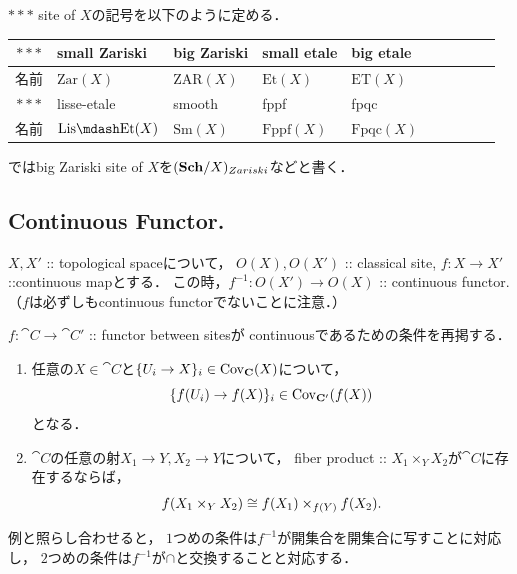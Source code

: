 \documentclass[a4paper]{jsarticle}
\begin{document}
\begin{Def}
    $***$ site of $X$の記号を以下のように定める．
\begin{table}[ht]
\begin{tabular}{c|lllllllll@{}}
    \toprule
    $***$ & small Zariski     & big Zariski       & small etale      & big etale\\ \midrule
    名前    & $\mathrm{Zar}(X)$ & $\mathrm{ZAR}(X)$ & $\mathrm{Et}(X)$ & $\mathrm{ET}(X)$ \\ \hline \hline
    $***$ & lisse-etale         & smooth           & fppf               & fpqc               \\ \midrule
    名前    & $\mathrm{Lis\mdash Et}(X)$ & $\mathrm{Sm}(X)$ & $\mathrm{Fppf}(X)$ & $\mathrm{Fpqc}(X)$ \\ \bottomrule
\end{tabular}
\end{table}

    \cite{StacksProj}ではbig Zariski site of $X$を$(\mathbf{Sch}/X)_{Zariski}$などと書く．
\end{Def}


\subsection{Continuous Functor.}
\begin{Example}
    $X, X'$ :: topological spaceについて，
    $O(X), O(X')$ :: classical site,
    $f \colon X \to X'$ ::continuous mapとする．
    この時，$f^{-1} \colon O(X') \to O(X)$ :: continuous functor.
    （$f$は必ずしもcontinuous functorでないことに注意．）
\end{Example}

\begin{Remark}
    $f \colon \cat{C} \to \cat{C}'$ :: functor between sitesが
    continuousであるための条件を再掲する．
    \begin{enumerate}
        \item 
        任意の$X \in \cat{C}$と$\{U_i \to X\}_i \in \operatorname{Cov}_{\mathbf{C}}(X)$について，
        \[ \{ f(U_i) \to f(X) \}_i \in \operatorname{Cov}_{\mathbf{C}'}(f(X)) \]となる．

        \item
        $\cat{C}$の任意の射$X_1 \to Y, X_2 \to Y$について，
        fiber product :: $X_1 \times_Y X_2$が$\cat{C}$に存在するならば，
        \[ f(X_1 \times_Y X_2) \cong f(X_1) \times_{f(Y)} f(X_2). \]
    \end{enumerate}
    
    例と照らし合わせると，
    $1$つめの条件は$f^{-1}$が開集合を開集合に写すことに対応し，
    $2$つめの条件は$f^{-1}$が$\cap$と交換することと対応する．
\end{Remark}
\end{document}
